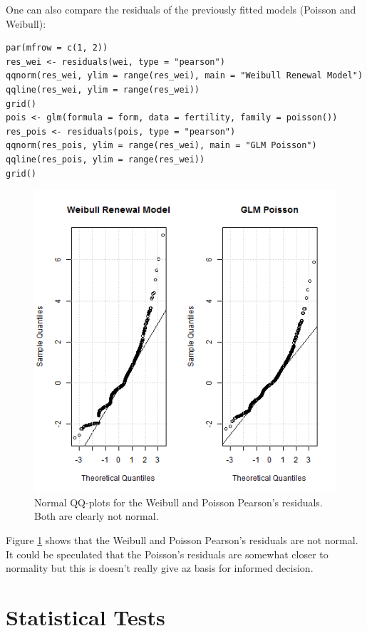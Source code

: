 \documentclass[a4paper,twoside,11pt]{article}
\begin{document}
One can also compare the residuals of the previously fitted models (Poisson and
Weibull):

\begin{verbatim}
par(mfrow = c(1, 2))
res_wei <- residuals(wei, type = "pearson")
qqnorm(res_wei, ylim = range(res_wei), main = "Weibull Renewal Model")
qqline(res_wei, ylim = range(res_wei))
grid()
pois <- glm(formula = form, data = fertility, family = poisson())
res_pois <- residuals(pois, type = "pearson")
qqnorm(res_pois, ylim = range(res_wei), main = "GLM Poisson")
qqline(res_pois, ylim = range(res_wei))
grid()
\end{verbatim}

\begin{figure}[htbp]
\centering
\includegraphics[width=.9\linewidth]{compare_residuals.png}
\caption{\label{fig:org4fef672}
Normal QQ-plots for the Weibull and Poisson Pearson's residuals. Both are clearly not normal.}
\end{figure}

Figure \ref{fig:org4fef672} shows that the Weibull and Poisson Pearson's
residuals are not normal. It could be speculated that the Poisson's residuals
are somewhat closer to normality but this is doesn't really give az basis for
informed decision.


\section{Statistical Tests}
\label{sec:org0ecd51a}
\end{document}
